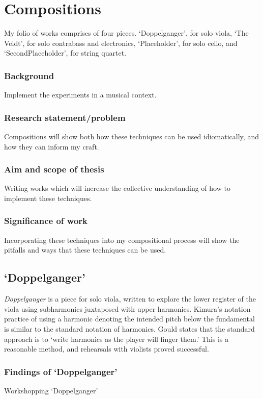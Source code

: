 
\chapter{Compositions}
My folio of works comprises of four pieces. `Doppelganger', for solo viola, `The Veldt', for solo contrabass and electronics, `Placeholder', for solo cello, and `SecondPlaceholder', for string quartet.
\subsection{Background}
Implement the experiments in a musical context.
\subsection{Research statement/problem}
Compositions will show both how these techniques can be used idiomatically, and how they can inform my craft.
\subsection{Aim and scope of thesis}
Writing works which will increase the collective understanding of how to implement these techniques.
\subsection{Significance of work}
Incorporating these techniques into my compositional process will show the pitfalls and ways that these techniques can be used.
\section{`Doppelganger'}
\textit{Doppelganger} is a piece for solo viola, written to explore the lower register of the viola using subharmonics juxtaposed with upper harmonics. Kimura's notation practice of using a harmonic denoting the intended pitch below the fundamental is similar to the standard notation of harmonics. Gould states that the standard approach is to `write harmonics as the player will finger them.'\autocite[413]{gouldBars2011} This is a reasonable method, and rehearsals with violists proved successful. 

\subsection{Findings of `Doppelganger'}
Workshopping `Doppelganger' \lipsum[3]

